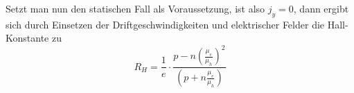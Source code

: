 Setzt man nun den statischen Fall als Voraussetzung, ist also $j_y=0$, dann ergibt sich durch Einsetzen der Driftgeschwindigkeiten und elektrischer Felder die Hall-Konstante zu
\begin{equation}
 R_H = \frac{1}{e}\cdot\frac{p-n\left(\frac{\mu_e}{\mu_h}\right)^2}{\left(p+n\frac{\mu_e}{\mu_h}\right)}
\end{equation}
